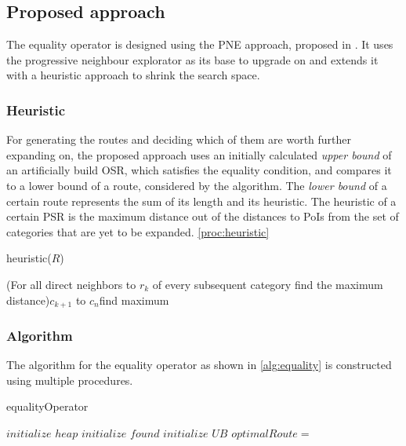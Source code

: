 \subsection{Proposed approach} 
\label{sec:approachEO}
The equality operator is designed using the PNE approach, proposed in \cite{OSR}. It uses the progressive neighbour explorator as its base to upgrade on and extends it with a heuristic approach to shrink the search space.

\subsubsection{Heuristic}
For generating the routes and deciding which of them are worth further expanding on, the proposed approach uses an initially calculated \textit{upper bound} of an artificially build OSR, which satisfies the equality condition, and compares it to a lower bound of a route, considered by the algorithm. The \textit{lower bound} of a certain route represents the sum of its length and its heuristic. The heuristic of a certain PSR is the maximum distance out of the distances to PoIs from the set of categories that are yet to be expanded.  \ref{proc:heuristic}

\begin{procedure}[H]
	\label{proc:heuristic}
	\caption{heuristic($R$)}
	\For(For all direct neighbors to $r_k$ of every subsequent category find the maximum distance){$c_{k+1}$ to $c_n$}{find maximum\;}
\end{procedure}

\subsubsection{Algorithm}

The algorithm for the equality operator as shown in \ref{alg:equality} is constructed using multiple procedures.

\begin{algorithm}[H]
	\label{alg:equality}
	\caption{equalityOperator}
	
	
	\BlankLine
	
	$initialize$ $heap$ 
	$initialize$ $found$ 
	$initialize$ $UB$\; 
	$optimalRoute =$\;
	{
		\dummySR{}\;
		\modifiedPNE{}\;
	}
\end{algorithm}

